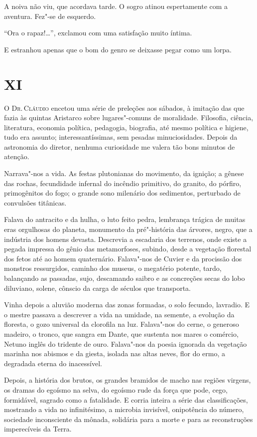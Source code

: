 A noiva não viu, que acordava tarde. O sogro atinou espertamente com a
aventura. Fez"-se de esquerdo. 

``Ora o rapaz!\ldots{}'', exclamou com uma satisfação muito íntima. 

E estranhou apenas que o bom do genro se
deixasse pegar como um lorpa.

\section{XI}

\noindent\textsc{O Dr.\,Cláudio} encetou uma série de preleções aos sábados, à imitação das
que fazia às quintas Aristarco sobre lugares"-comuns de moralidade.
Filosofia, ciência, literatura, economia política, pedagogia,
biografia, até mesmo política e higiene, tudo era assunto;
interessantíssimas, sem pesadas minuciosidades. Depois da astronomia do
diretor, nenhuma curiosidade me valera tão bons minutos de atenção.

Narrava"-nos a vida. As festas plutonianas do movimento, da ignição; a
gênese das rochas, fecundidade infernal do incêndio primitivo, do
granito, do pórfiro, primogênitos do fogo; o grande sono milenário dos
sedimentos, perturbado de convulsões titânicas. 

Falava do antracito e
da hulha, o luto feito pedra, lembrança trágica de muitas eras
orgulhosas do planeta, monumento da pré"-história das árvores, negro,
que a indústria dos homens devasta. Descrevia a escadaria dos terrenos,
onde existe a pegada impressa do gênio das metamorfoses, subindo, desde
a vegetação florestal dos fetos até ao homem quaternário. Falava"-nos
de Cuvier e da procissão dos monstros ressurgidos, caminho dos museus,
o megatério potente, tardo, balançando as passadas, sujo, descamando
saibro e as concreções secas do lobo diluviano, solene, cônscio da
carga de séculos que transporta.

Vinha depois a aluvião moderna das zonas formadas, o solo fecundo,
lavradio. E o mestre passava a descrever a vida na umidade, na semente,
a evolução da floresta, o gozo universal da clorofila na luz.
Falava"-nos do cerne, o generoso madeiro, o tronco, que sangra em
Dante, que sustenta nos mares o comércio, Netuno inglês do tridente de
ouro. Falava"-nos da poesia ignorada da vegetação marinha nos abismos
e da giesta, isolada nas altas neves, flor do ermo, a degradada eterna
do inacessível. 

Depois, a história dos brutos, os grandes bramidos de
macho nas regiões virgens, os dramas do egoísmo na selva, do egoísmo
rude da força que pode, cego, formidável, sagrado como a fatalidade. E
corria inteira a série das classificações, mostrando a vida no
infinitésimo, a microbia invisível, onipotência do número, sociedade
inconsciente da mônada, solidária para a morte e para as reconstruções
imperecíveis da Terra. 

